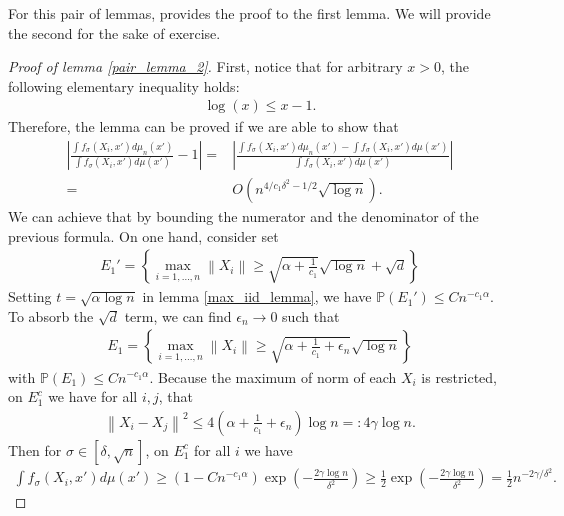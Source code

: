 \documentclass[10pt]{article}
\newcommand{\p}{\mathbb{P}}
\newcommand{\norm}[1]{\left\lVert#1\right\rVert}
\newenvironment{Proof of lemma}{\noindent{\bf Proof of Lemma}}{\hfill$\Box$\newline}
\newenvironment{Proof of claim}{\noindent{\bf Proof of claim}}{\hfill$\Box$\newline}
\newenvironment{Proof of theorem}{\noindent{\bf Proof of Theorem}}{\hfill\scriptsize{$\Box$}\newline}
\newenvironment{Proof of theorems}{\noindent{\bf Proof of Theorems}}{\hfill$\Box$\newline}
\newenvironment{Proof of proposition}{\noindent{\bf Proof of Proposition}}{\hfill$\Box$\newline}
\newenvironment{Proof of propositions}{\noindent{\bf Proof of Propositions}}{\hfill$\Box$\newline}
\newenvironment{Proof of exercise}{\noindent{\it Proof of Exercise:}}{\hfill$\Box$}
\numberwithin{equation}{section}
\begin{document}
For this pair of lemmas, \cite{auffinger-tsne} provides the proof to the first lemma. We will provide the second for the sake of exercise.
\begin{proof}[Proof of lemma \ref{pair_lemma_2}]
    First, notice that for arbitrary $x>0$, the following elementary inequality holds:
    \begin{align}
        \log(x) \leq x-1.
    \end{align}
    Therefore, the lemma can be proved if we are able to show that
    \begin{align}
        \left|\frac{\int f_{\sigma}(X_i,x')d\mu_n (x')}{\int f_{\sigma}(X_i,x')d\mu (x')} - 1 \right| = & \left|\frac{\int f_{\sigma}(X_i,x')d\mu_n (x')-\int f_{\sigma}(X_i,x')d\mu (x')}{\int f_{\sigma}(X_i,x')d\mu (x')} \right|\nonumber \\
        =                                                                                               & O(n^{4/c_1\delta^2 -1/2}\sqrt{\log n}).
    \end{align}
    We can achieve that by bounding the numerator and the denominator of the previous formula. On one hand, consider set
    \begin{align}
        E_1' = \left \{ \max_{i=1,\dots,n}\norm{X_i} \geq \sqrt{\alpha+\frac{1}{c_1}} \sqrt{\log n}+\sqrt{d}\right \}
    \end{align}
    Setting $t = \sqrt{\alpha \log n}$ in lemma \ref{max_iid_lemma}, we have $\p(E_1') \leq Cn^{-c_1\alpha}$. To absorb the $\sqrt{d}$ term, we can find $\epsilon_n \to 0$ such that
    \begin{align}
        E_1 = \left \{ \max_{i=1,\dots,n}\norm{X_i} \geq \sqrt{\alpha+\frac{1}{c_1}+\epsilon_n} \sqrt{\log n}\right \}
    \end{align}
    with $\p(E_1) \leq Cn^{-c_1\alpha}$.
    Because the maximum of norm of each $X_i$ is restricted, on $E_1^c$ we have for all $i,j$, that
    \begin{align}
        \norm{X_i-X_j}^2 \leq 4 \left(\alpha + \frac{1}{c_1} +\epsilon_n\right) \log n =:4\gamma \log n.
    \end{align}
    Then for $\sigma \in [\delta, \sqrt{n}]$, on $E_1^c$ for all $i$ we have
    \begin{align} \label{log_esti_1}
        \int f_{\sigma}(X_i,x')d\mu(x') \geq (1-Cn^{-c_1\alpha})\exp \left(-\frac{2\gamma \log n}{\delta^2}\right) \geq \frac{1}{2} \exp \left(-\frac{2\gamma \log n}{\delta^2}\right) =\frac{1}{2}n^{-2\gamma/\delta^2}.
    \end{align}

\end{proof}
\end{document}
